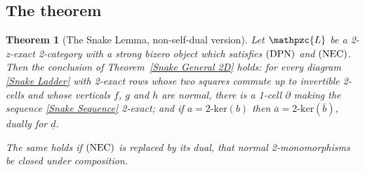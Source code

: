 \documentclass[reqno,a4paper]{amsart}
\numberwithin{equation}{section}
\theoremstyle{plain}
\newtheorem{theorem}[subsection]{Theorem}
\theoremstyle{definition}
\def\nameit#1{\textrm{#1}~}
\def\thex{\nameit{Theorem}}
\newcommand{\ov}[1]{\overline{#1}}
\newcommand{\catfont}[1]{\ensuremath{\mathpzc{#1}}\xspace}
\def\L{\catfont{L}}
\renewcommand{\1}{\onecat{1}}
\newcommand{\DPN}{\textup{(DPN)}}
\newcommand{\NEC}{\textup{(NEC)}}
\newcommand{\twoker}{\ensuremath{2\text{-}\mathrm{ker}}}
\begin{document}
\subsection{The theorem}\label{SS:NSDTheorem}

\begin{theorem}[The Snake Lemma, non-self-dual version]\label{T:SnakeNonSelfDual}
	Let \(\L\) be a 2-z-exact 2-category with a strong bizero object which satisfies \(\DPN\) and \(\NEC\). Then the conclusion of \thex\ref{Snake General 2D} holds: for every diagram \eqref{Snake Ladder} with 2-exact rows whose two squares commute up to invertible 2-cells and whose verticals \(f\), \(g\) and \(h\) are normal, there is a 1-cell \(\partial\) making the sequence \eqref{Snake Sequence} 2-exact; and if \(a=\twoker(b)\) then \(\ov{a}=\twoker(\ov{b})\), dually for \(\underline{d}\).

	The same holds if \(\NEC\) is replaced by its dual, that normal 2-monomorphisms be closed under composition.
\end{theorem}
\end{document}
